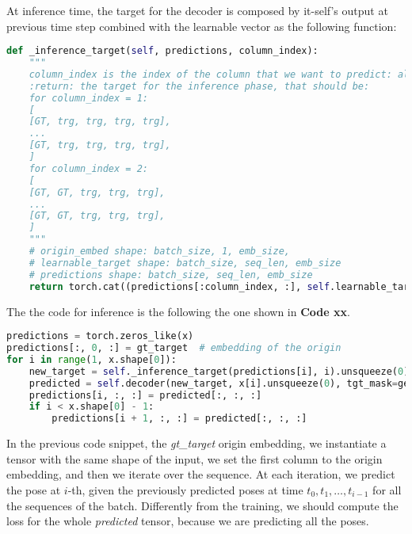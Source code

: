 At inference time, the target for the decoder is composed by it-self's output at previous time step combined with the learnable vector as the following function:
\begin{lstlisting}[captionpos=b, label={lst:lst-inference-target}, caption={Inference target}, language=Python]
def _inference_target(self, predictions, column_index):
    """
    column_index is the index of the column that we want to predict: always 0 < x < seq_len
    :return: the target for the inference phase, that should be:
    for column_index = 1:
    [
    [GT, trg, trg, trg, trg],
    ...
    [GT, trg, trg, trg, trg],
    ]
    for column_index = 2:
    [
    [GT, GT, trg, trg, trg],
    ...
    [GT, GT, trg, trg, trg],
    ]
    """
    # origin_embed shape: batch_size, 1, emb_size,
    # learnable_target shape: batch_size, seq_len, emb_size
    # predictions shape: batch_size, seq_len, emb_size
    return torch.cat((predictions[:column_index, :], self.learnable_target[column_index:, :]), dim=0)
\end{lstlisting}

The the code for inference is the following the one shown in \textbf{Code xx}.
\begin{lstlisting}[captionpos=b, label={lst:lst-inference}, caption={Inference}, language=Python]
predictions = torch.zeros_like(x)
predictions[:, 0, :] = gt_target  # embedding of the origin
for i in range(1, x.shape[0]):
    new_target = self._inference_target(predictions[i], i).unsqueeze(0)
    predicted = self.decoder(new_target, x[i].unsqueeze(0), tgt_mask=generate_upper_triangular_mask(x.shape).to(self.device))
    predictions[i, :, :] = predicted[:, :, :]
    if i < x.shape[0] - 1:
        predictions[i + 1, :, :] = predicted[:, :, :]
\end{lstlisting}
In the previous code snippet, the \textit{gt\_target} origin embedding, we instantiate a tensor with the same shape of the input, we set the first column to the origin embedding, and then we iterate over the sequence.
At each iteration, we predict the pose at $i$-th, given the previously predicted poses at time $t_0, t_1, \dots, t_{i-1}$ for all the sequences of the batch.
Differently from the training, we should compute the loss for the whole \textit{predicted} tensor, because we are predicting all the poses.
